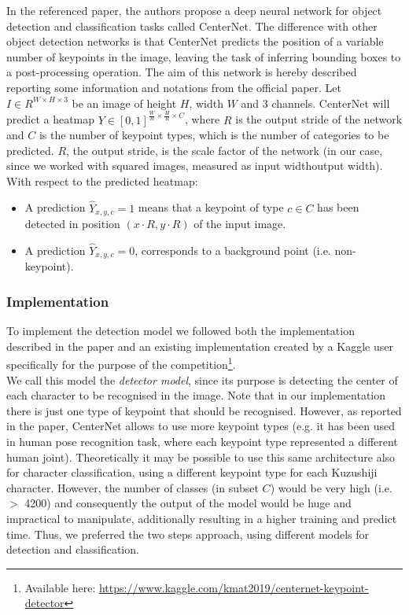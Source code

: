 In the referenced paper, the authors propose a deep neural network for object detection and classification tasks called CenterNet. The difference with other object detection networks is that CenterNet predicts the position of a variable number of keypoints in the image, leaving the task of inferring bounding boxes to a post-processing operation. The aim of this network is hereby described reporting some information and notations from the official paper. Let $I \in R^{W \times H \times 3}$ be an image of height $H$, width $W$ and 3 channels. CenterNet will predict a heatmap  $Y \in [0,1]^{\frac{W}{R} \times \frac{H}{R} \times C}$, where $R$ is the output stride of the network and $C$ is the number of keypoint types, which is the number of categories to be predicted. $R$, the output stride, is the scale factor of the network (in our case, since we worked with squared images, measured as input widthoutput width). With respect to the predicted heatmap:
\begin{itemize}
	\item A prediction $\hat{Y}_{x,y,c}=1$ means that a keypoint of type $c \in C$ has been detected in position $(x \cdot R, y \cdot R)$ of the input image.
	\item A prediction $\hat{Y}_{x,y,c}=0$, corresponds to a background point (i.e. non-keypoint).
\end{itemize}

\subsubsection{Implementation}
\label{sssec:implementationdet}

To implement the detection model we followed both the implementation described in the paper and an existing implementation created by a Kaggle user specifically for the purpose of the competition\footnote{Available here: \url{https://www.kaggle.com/kmat2019/centernet-keypoint-detector}}.\\ We call this model the \textit{detector model}, since its purpose is detecting the center of each character to be recognised in the image. Note that in our implementation there is just one type of keypoint that should be recognised. However, as reported in the paper, CenterNet allows to use more keypoint types (e.g. it has been used in human pose recognition task, where each keypoint type represented a different human joint). Theoretically it may be possible to use this same architecture also for character classification, using a different keypoint type for each Kuzushiji character. However, the number of classes (in subset $C$) would be very high (i.e. $>$ 4200) and consequently the output of the model would be huge and impractical to manipulate, additionally resulting in a higher training and predict time. Thus, we preferred the two steps approach, using different models for detection and classification.

